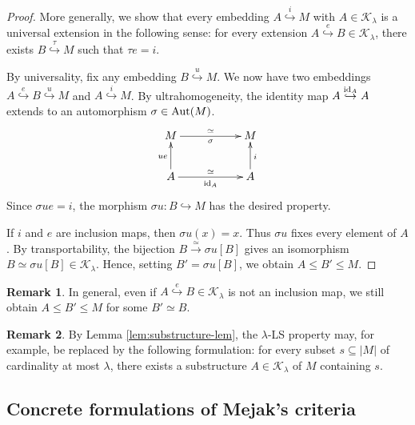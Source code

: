 \documentclass[10pt]{amsart}
\numberwithin{equation}{section}
\theoremstyle{plain}
\theoremstyle{definition}
\newtheorem*{remark}{Remark}
\newcommand{\K}{\mathcal{K}}
\newcommand{\embed}{\hookrightarrow}
\newcommand{\edge}[1]{\overset{#1}{\longrightarrow}}
\newcommand{\embedge}[1]{\overset{#1}{\embed}}
\begin{document}
\begin{proof}
More generally, we show that every embedding $A\embedge{i}M$ with $A\in\K_\lambda$ is a universal extension in the following sense:
for every extension $A\embedge{e}B\in\K_\lambda$, there exists $B\embedge{\tau}M$ such that $\tau e=i$.

By universality, fix any embedding $B\embedge{u}M$.
We now have two embeddings $A\embedge{e}B\embedge{u}M$ and $A\embedge{i}M$.
By ultrahomogeneity, the identity map $A\embedge{{\rm id}_A}A$ extends to an automorphism $\sigma\in{\rm Aut}(M)$.
\[
\xymatrix{
	M \ar[rr]^{\simeq}_\sigma & & M\\
	A \ar[u]^{ue} \ar[rr]^{\simeq}_{{\rm id}_A} & & A \ar[u]_{i}
}
\]
Since $\sigma  ue=i$, the morphism $\sigma u\colon B\embed M$ has the desired property.

If $i$ and $e$ are inclusion maps, then $\sigma u(x)=x$.
Thus $\sigma u$ fixes every element of $A$.
By transportability, the bijection $B\edge{\simeq}\sigma u[B]$ gives an isomorphism $B\simeq \sigma u[B]\in\K_\lambda$.
Hence, setting $B'=\sigma u[B]$, we obtain $A\leq B'\leq M$.
\end{proof}

\begin{remark}
In general, even if $A\embedge{e}B\in\K_\lambda$ is not an inclusion map, we still obtain $A\leq B'\leq M$ for some $B'\simeq B$.
\end{remark}


\begin{remark}
By Lemma \ref{lem:substructure-lem}, the $\lambda$-LS property may, for example, be replaced by the following formulation:
for every subset $s\subseteq|M|$ of cardinality at most $\lambda$, there exists a substructure $A\in\K_\lambda$ of $M$ containing $s$.
\end{remark}



\subsection{Concrete formulations of Mejak's criteria}
\end{document}
